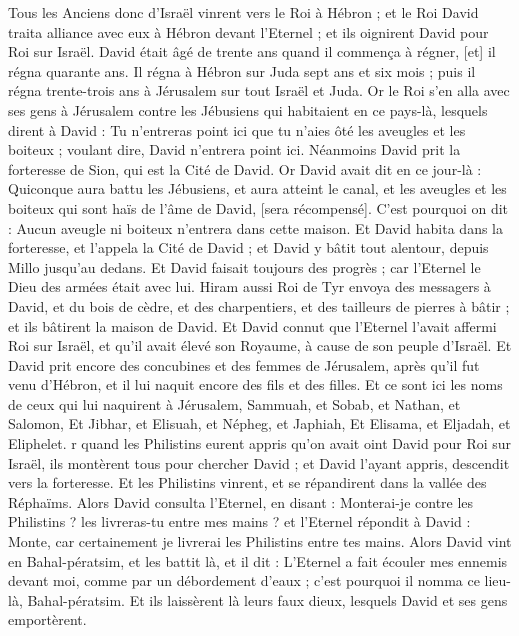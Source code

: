 \begin{multicols}{2}
Tous les Anciens donc d'Israël vinrent vers le Roi à Hébron ; et le Roi David traita alliance avec eux à Hébron devant l'Eternel ; et ils oignirent David pour Roi sur Israël.
David était âgé de trente ans quand il commença à régner, [et] il régna quarante ans.
Il régna à Hébron sur Juda sept ans et six mois ; puis il régna trente-trois ans à Jérusalem sur tout Israël et Juda.
Or le Roi s'en alla avec ses gens à Jérusalem contre les Jébusiens qui habitaient en ce pays-là, lesquels dirent à David : Tu n'entreras point ici que tu n'aies ôté les aveugles et les boiteux ; voulant dire, David n'entrera point ici.
Néanmoins David prit la forteresse de Sion, qui est la Cité de David.
Or David avait dit en ce jour-là : Quiconque aura battu les Jébusiens, et aura atteint le canal, et les aveugles et les boiteux qui sont haïs de l'âme de David, [sera récompensé]. C'est pourquoi on dit : Aucun aveugle ni boiteux n'entrera dans cette maison.
Et David habita dans la forteresse, et l'appela la Cité de David ; et David y bâtit tout alentour, depuis Millo jusqu'au dedans.
Et David faisait toujours des progrès ; car l'Eternel le Dieu des armées était avec lui.
Hiram aussi Roi de Tyr envoya des messagers à David, et du bois de cèdre, et des charpentiers, et des tailleurs de pierres à bâtir ; et ils bâtirent la maison de David.
Et David connut que l'Eternel l'avait affermi Roi sur Israël, et qu'il avait élevé son Royaume, à cause de son peuple d'Israël.
Et David prit encore des concubines et des femmes de Jérusalem, après qu'il fut venu d'Hébron, et il lui naquit encore des fils et des filles.
Et ce sont ici les noms de ceux qui lui naquirent à Jérusalem, Sammuah, et Sobab, et Nathan, et Salomon,
Et Jibhar, et Elisuah, et Népheg, et Japhiah,
Et Elisama, et Eljadah, et Eliphelet.
r quand les Philistins eurent appris qu'on avait oint David pour Roi sur Israël, ils montèrent tous pour chercher David ; et David l'ayant appris, descendit vers la forteresse.
Et les Philistins vinrent, et se répandirent dans la vallée des Réphaïms.
Alors David consulta l'Eternel, en disant : Monterai-je contre les Philistins ? les livreras-tu entre mes mains ? et l'Eternel répondit à David : Monte, car certainement je livrerai les Philistins entre tes mains.
Alors David vint en Bahal-pératsim, et les battit là, et il dit : L'Eternel a fait écouler mes ennemis devant moi, comme par un débordement d'eaux ; c'est pourquoi il nomma ce lieu-là, Bahal-pératsim.
Et ils laissèrent là leurs faux dieux, lesquels David et ses gens emportèrent.

\end{multicols}
